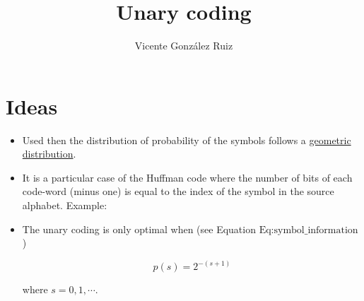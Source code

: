 
\title{Unary coding}

\author{Vicente González Ruiz}

\maketitle

\section{Ideas}
\begin{itemize}
\item
  Used then the distribution of probability of the symbols follows a
  \href{https://en.wikipedia.org/wiki/Geometric_distribution}{geometric
  distribution}.
\item
  It is a particular case of the Huffman code where the number of bits
  of each code-word (minus one) is equal to the index of the symbol in
  the source alphabet. Example:
\end{itemize}


\begin{itemize}
\item
  The unary coding is only optimal when (see Equation
  \(\text{Eq:symbol_information}\))

  \begin{equation}
    p(s) = 2^{-(s+1)} \tag{Eq:Unary}
  \end{equation}

  where \(s=0,1,\cdots\).
\end{itemize}

